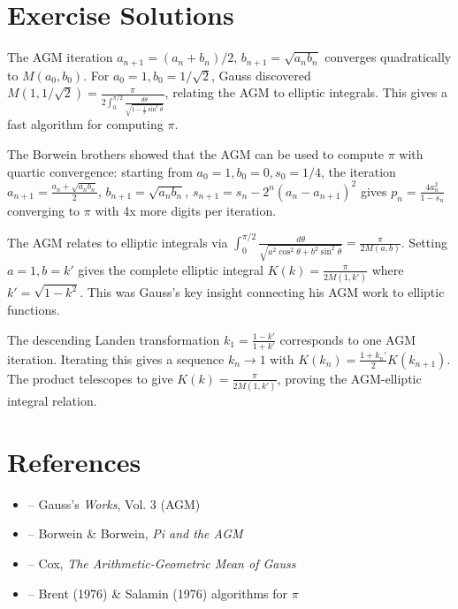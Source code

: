 \section{Exercise Solutions}

\begin{solution}
The AGM iteration $a_{n+1} = (a_n+b_n)/2$, $b_{n+1} = \sqrt{a_n b_n}$ converges quadratically to $M(a_0, b_0)$. For $a_0 = 1, b_0 = 1/\sqrt{2}$, Gauss discovered $M(1, 1/\sqrt{2}) = \frac{\pi}{2\int_0^{\pi/2}\frac{d\theta}{\sqrt{1-\frac{1}{2}\sin^2\theta}}}$, relating the AGM to elliptic integrals. This gives a fast algorithm for computing $\pi$.
\end{solution}

\begin{solution}
The Borwein brothers showed that the AGM can be used to compute $\pi$ with quartic convergence: starting from $a_0 = 1, b_0 = 0, s_0 = 1/4$, the iteration $a_{n+1} = \frac{a_n+\sqrt{a_n b_n}}{2}$, $b_{n+1} = \sqrt{a_n b_n}$, $s_{n+1} = s_n - 2^n(a_n - a_{n+1})^2$ gives $p_n = \frac{4a_n^2}{1-s_n}$ converging to $\pi$ with 4x more digits per iteration.
\end{solution}

\begin{solution}
The AGM relates to elliptic integrals via $\int_0^{\pi/2}\frac{d\theta}{\sqrt{a^2\cos^2\theta + b^2\sin^2\theta}} = \frac{\pi}{2M(a,b)}$. Setting $a = 1, b = k'$ gives the complete elliptic integral $K(k) = \frac{\pi}{2M(1,k')}$ where $k' = \sqrt{1-k^2}$. This was Gauss's key insight connecting his AGM work to elliptic functions.
\end{solution}

\begin{solution}
The descending Landen transformation $k_1 = \frac{1-k'}{1+k'}$ corresponds to one AGM iteration. Iterating this gives a sequence $k_n \to 1$ with $K(k_n) = \frac{1+k_n'}{2}K(k_{n+1})$. The product telescopes to give $K(k) = \frac{\pi}{2M(1,k')}$, proving the AGM-elliptic integral relation.
\end{solution}


\section{References}

\begin{itemize}
    \item \cite{gauss-works} -- Gauss's \textit{Works}, Vol. 3 (AGM)
    \item \cite{borwein-borwein} -- Borwein \& Borwein, \textit{Pi and the AGM}
    \item \cite{cox-agm} -- Cox, \textit{The Arithmetic-Geometric Mean of Gauss}
    \item \cite{brent-salamin} -- Brent (1976) \& Salamin (1976) algorithms for $\pi$
\end{itemize}